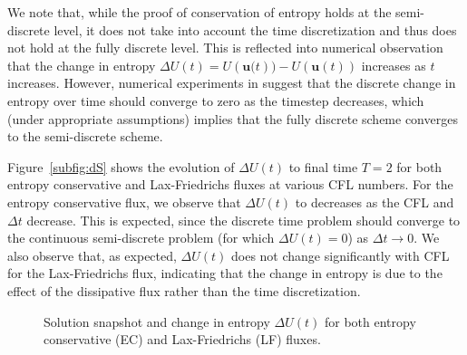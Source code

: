 \documentclass[preprint,10pt]{article}
\theoremstyle{definition}
\theoremstyle{lemma}
\theoremstyle{theorem}
\theoremstyle{assumption}
\newcommand{\LRp}[1]{\left( #1 \right)}
\begin{document}
We note that, while the proof of conservation of entropy holds at the semi-discrete level, it does not take into account the time discretization and thus does not hold at the fully discrete level.  This is reflected into numerical observation that the change in entropy $\Delta U(t) = U\LRp{\bm{u}(t}) - U\LRp{\bm{u}(t)}$ increases as $t$ increases.  However, numerical experiments in \cite{gassner2016well} suggest that the discrete change in entropy over time should converge to zero as the timestep decreases, which (under appropriate assumptions) implies that the fully discrete scheme converges to the semi-discrete scheme.  

Figure~\ref{subfig:dS} shows the evolution of $\Delta U(t)$ to final time $T=2$ for both entropy conservative and Lax-Friedrichs fluxes at various CFL numbers.  For the entropy conservative flux, we observe that $\Delta U(t)$ to decreases as the CFL and $\Delta t$ decrease.  This is expected, since the discrete time problem should converge to the continuous semi-discrete problem (for which $\Delta U(t) = 0$) as $\Delta t\rightarrow 0$.  We also observe that, as expected, $\Delta U(t)$ does not change significantly with CFL for the Lax-Friedrichs flux, indicating that the change in entropy is due to the effect of the dissipative flux rather than the time discretization.

\begin{figure}
\centering
{}
\hspace{.5em}
\caption{Solution snapshot and change in entropy $\Delta U(t)$ for both entropy conservative (EC) and Lax-Friedrichs (LF) fluxes.}
\label{fig:dS}
\end{figure}
\end{document}
